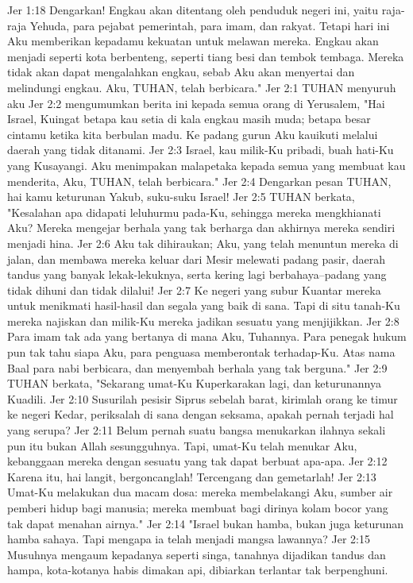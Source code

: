Jer 1:18  Dengarkan! Engkau akan ditentang oleh penduduk negeri ini, yaitu raja-raja Yehuda, para pejabat pemerintah, para imam, dan rakyat. Tetapi hari ini Aku memberikan kepadamu kekuatan untuk melawan mereka. Engkau akan menjadi seperti kota berbenteng, seperti tiang besi dan tembok tembaga. Mereka tidak akan dapat mengalahkan engkau, sebab Aku akan menyertai dan melindungi engkau. Aku, TUHAN, telah berbicara."
Jer 2:1  TUHAN menyuruh aku
Jer 2:2  mengumumkan berita ini kepada semua orang di Yerusalem, "Hai Israel, Kuingat betapa kau setia di kala engkau masih muda; betapa besar cintamu ketika kita berbulan madu. Ke padang gurun Aku kauikuti melalui daerah yang tidak ditanami.
Jer 2:3  Israel, kau milik-Ku pribadi, buah hati-Ku yang Kusayangi. Aku menimpakan malapetaka kepada semua yang membuat kau menderita, Aku, TUHAN, telah berbicara."
Jer 2:4  Dengarkan pesan TUHAN, hai kamu keturunan Yakub, suku-suku Israel!
Jer 2:5  TUHAN berkata, "Kesalahan apa didapati leluhurmu pada-Ku, sehingga mereka mengkhianati Aku? Mereka mengejar berhala yang tak berharga dan akhirnya mereka sendiri menjadi hina.
Jer 2:6  Aku tak dihiraukan; Aku, yang telah menuntun mereka di jalan, dan membawa mereka keluar dari Mesir melewati padang pasir, daerah tandus yang banyak lekak-lekuknya, serta kering lagi berbahaya--padang yang tidak dihuni dan tidak dilalui!
Jer 2:7  Ke negeri yang subur Kuantar mereka untuk menikmati hasil-hasil dan segala yang baik di sana. Tapi di situ tanah-Ku mereka najiskan dan milik-Ku mereka jadikan sesuatu yang menjijikkan.
Jer 2:8  Para imam tak ada yang bertanya di mana Aku, Tuhannya. Para penegak hukum pun tak tahu siapa Aku, para penguasa memberontak terhadap-Ku. Atas nama Baal para nabi berbicara, dan menyembah berhala yang tak berguna."
Jer 2:9  TUHAN berkata, "Sekarang umat-Ku Kuperkarakan lagi, dan keturunannya Kuadili.
Jer 2:10  Susurilah pesisir Siprus sebelah barat, kirimlah orang ke timur ke negeri Kedar, periksalah di sana dengan seksama, apakah pernah terjadi hal yang serupa?
Jer 2:11  Belum pernah suatu bangsa menukarkan ilahnya sekali pun itu bukan Allah sesungguhnya. Tapi, umat-Ku telah menukar Aku, kebanggaan mereka dengan sesuatu yang tak dapat berbuat apa-apa.
Jer 2:12  Karena itu, hai langit, bergoncanglah! Tercengang dan gemetarlah!
Jer 2:13  Umat-Ku melakukan dua macam dosa: mereka membelakangi Aku, sumber air pemberi hidup bagi manusia; mereka membuat bagi dirinya kolam bocor yang tak dapat menahan airnya."
Jer 2:14  "Israel bukan hamba, bukan juga keturunan hamba sahaya. Tapi mengapa ia telah menjadi mangsa lawannya?
Jer 2:15  Musuhnya mengaum kepadanya seperti singa, tanahnya dijadikan tandus dan hampa, kota-kotanya habis dimakan api, dibiarkan terlantar tak berpenghuni.
